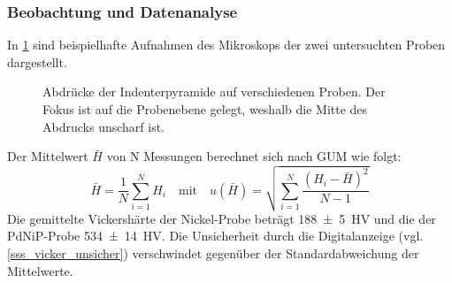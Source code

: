 \documentclass[
	a4paper,
	12pt,
	pagesize,
	ngerman
]{scrartcl}
\begin{document}
	\subsubsection{Beobachtung und Datenanalyse}
	In \cref{fig_indents} sind beispielhafte Aufnahmen des Mikroskops der zwei untersuchten Proben dargestellt.
	\begin{figure}[H]
		\centering
			\caption{Abdrücke der Indenterpyramide auf verschiedenen Proben. Der Fokus ist auf die Probenebene gelegt, weshalb die Mitte des Abdrucks unscharf ist.}
			\label{fig_indents}
 \end{figure}
 Der Mittelwert $\bar{H}$ von N Messungen berechnet sich nach GUM wie folgt:
 \begin{equation}
	 \bar{H} = \frac{1}{N}\sum_{i=1}^N H_i \quad \text{mit} \quad u(\bar{H}) = \sqrt{\sum_{i=1}^N \frac{(H_i-\bar{H})^2}{N-1}}
 \end{equation}
 Die gemittelte Vickershärte der Nickel-Probe beträgt \SI{188+-5}{HV} und die der PdNiP-Probe \SI{534+-14}{HV}.
 Die Unsicherheit durch die Digitalanzeige (vgl. \ref{sss_vicker_unsicher}) verschwindet gegenüber der Standardabweichung der Mittelwerte.
\end{document}

